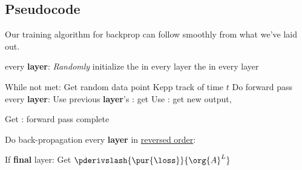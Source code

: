 
        
    
    \subsection{Pseudocode}
    
        Our training algorithm for backprop can follow smoothly from what we've laid out.
     
        \begin{codebox}
            
            \li \For every \textbf{layer}:
                \Do
                \li \textit{Randomly} initialize
                    \Do
                    \li the  in every layer
                    \li the  in every layer
                    \End
                \End
                \li
            
            \li While  not met:
                \Do
                    \li Get random data point 
                    \li Kepp track of time $t$
                    \li
                    \li Do forward pass
                        \Do
                            \li \For every \textbf{layer}:
                                \Do
                                    \li Use previous \textbf{layer}'s : get 
                                    \li Use : get new output, 
                                \End
                                \li
                            
                            \li Get : forward pass complete
                        \End
                        \li
                    
                    \li Do back-propagation
                        \Do
                            \li \For every \textbf{layer} in \underline{reversed order}:
                            
                            \Do
                                \li If \textbf{final} layer:
                                    \Do
                                        \li Get $\pderivslash{ \pur{\loss} }{ \org{A}^L }$
                                    \End
                                    \li
                                

\end{codebox}
